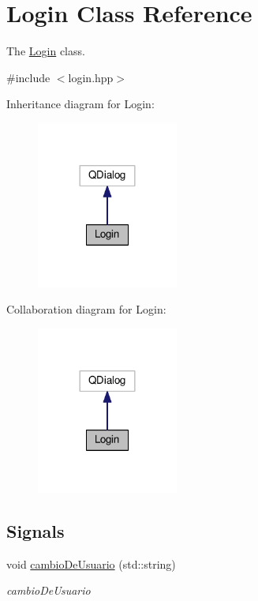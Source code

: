 \hypertarget{classLogin}{}\section{Login Class Reference}
\label{classLogin}


The \hyperlink{classLogin}{Login} class.  




{\ttfamily \#include $<$login.\+hpp$>$}



Inheritance diagram for Login\+:
\nopagebreak
\begin{figure}[H]
\begin{center}
\leavevmode
\includegraphics[width=132pt]{classLogin__inherit__graph}
\end{center}
\end{figure}


Collaboration diagram for Login\+:
\nopagebreak
\begin{figure}[H]
\begin{center}
\leavevmode
\includegraphics[width=132pt]{classLogin__coll__graph}
\end{center}
\end{figure}
\subsection*{Signals}
\begin{DoxyCompactItemize}
\item 
\hypertarget{classLogin_ab103305ffe0bcdc06392da0934639ef6}{}void \hyperlink{classLogin_ab103305ffe0bcdc06392da0934639ef6}{cambio\+De\+Usuario} (std\+::string)\label{classLogin_ab103305ffe0bcdc06392da0934639ef6}

\begin{DoxyCompactList}\small\item\em cambio\+De\+Usuario \end{DoxyCompactList}\end{DoxyCompactItemize}
